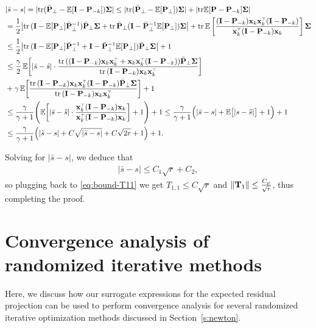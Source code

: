 \documentclass[thesis.tex]{subfiles}
\begin{document}
\begin{align*}
  &|\bar s - s|  = |\tr (\bar \P_\perp - \E[\I - \P_{-k}] )\Sigmab|   \le |\tr (\bar \P_\perp - \E[\P_\perp] )\Sigmab|   + |\tr \E[\P - \P_{-k}] \Sigmab| \\
  &= \frac12 \big|\tr\,(\I-\E[\P_\perp]\bar\P_\perp^{-1})\bar\P_\perp\Sigmab + \tr\,\bar\P_\perp (\I - \bar \P_\perp^{-1} \E[\P_\perp]) \Sigmab \big|   + \tr\,\E \left[ \frac{(\I - \P_{-k})\x_k\x_k^\top(\I - \P_{-k})}{\x_k^\top (\I - \P_{-k}) \x_k} \right] \Sigmab \\
  &\leq \frac12 \big|\tr\,(\I-\E[\P_\perp]\bar\P_\perp^{-1} + \I - \bar \P_\perp^{-1} \E[\P_\perp])\bar\P_\perp\Sigmab \big|   + 1 \\
  &\leq \frac{\gamma}2 \,\E\bigg[|\bar s-\hat s|\cdot
    \frac{\tr\,( (\I -\P_{-k})\x_k\x_k^\top + \x_k\x_k^\top (\I -\P_{-k})) \bar\P_\perp\Sigmab}{\tr\,(\I -\P_{-k})\x_k\x_k^\top}  \bigg] \\
  &+ \gamma\, \E\bigg[\frac{\tr\,(\I-\P_{-k})\x_k\x_k^\top(\I-\P_{-k})\bar\P_\perp\Sigmab}
    {\tr\,(\I-\P_{-k})\x_k\x_k^\top}\bigg] + 1\\
  &\leq \frac{\gamma}{\gamma+1}\Bigg(\E\bigg[|\bar s-\hat
    s| \cdot \frac{\x_k^\top (\I -\P_{-k}) \x_k}{\x_k^\top (\I -\P_{-k}) \x_k}  \bigg] + 1\Bigg) + 1\leq \frac{\gamma}{\gamma+1}\Big(|\bar
    s-s| + \E\big[|s-\hat s|\big] + 1\Big) + 1 \\
  &\leq \frac{\gamma}{\gamma+1}\Big(|\bar s- s| +
     C\sqrt{|\bar s- s|} + C\sqrt{2 r} + 1\Big) + 1.
\end{align*}

Solving for $|\bar s-s|$, we deduce that
\begin{align*}
  |\bar s-s| \leq C_1 \sqrt{r} + C_2,
\end{align*}
so plugging back to \eqref{eq:bound-T11} we get $T_{1,1} \le C
\sqrt r$ and $\| \mathbf{T}_1\| \le \frac{C_\rho}{\sqrt r} $, thus completing
the proof.
\section{Convergence analysis of randomized iterative methods}
\label{a:newton}

Here, we discuss how our surrogate expressions for the expected
residual projection can be used to perform convergence analysis for
several randomized iterative optimization methods discussed in
Section~\ref{s:newton}.
\end{document}
